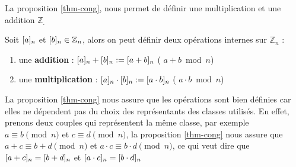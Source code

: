 \medskip

La proposition \ref{thm-cong}, nous permet de définir une multiplication et une addition $\mathbb{Z}_.$ 

\begin{definition}
Soit $[a]_{n}$ et $[b]_{n} \in \mathbb{Z}_n$, alors on peut définir deux opérations internes sur $\mathbb{Z}_n$ :

\begin{enumerate}[label=\textbf{\arabic*)}, leftmargin=*]
	\item une \textbf{addition} : $[a]_{n} + [b]_{n} := [a + b]_{n}$ \hfill ( $a + b \bmod n$)
	\item une \textbf{multiplication} : $[a]_{n} \cdot [b]_{n} := [a \cdot b]_{n}$ \hfill ( $a \cdot b \bmod n$)
\end{enumerate}
	
\end{definition}

\medskip

\begin{remarque}
	La proposition \ref{thm-cong} nous assure que les opérations sont bien définies car elles ne dépendent pas du choix des représentants des classes utilisés. En effet, prenons deux couples qui représentent la même classe, par exemple $a \equiv b \pmod n$ et $c \equiv d \pmod n$, la proposition \ref{thm-cong} nous assure que  $a+c \equiv b+d \pmod n$ et  $a\cdot c \equiv b\cdot d \pmod n$, ce qui veut dire que $[a+c]_{n}=[b+d]_{n}$ et $[a\cdot  c]_{n}=[b\cdot d]_{n}$	
\end{remarque}

\bigskip

